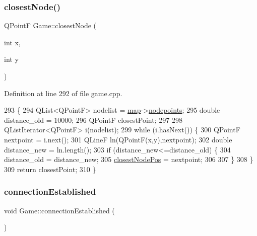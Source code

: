 \mbox{\label{class_game_ae0adfbcc271a45a2c3ede2c6b948beda}} 
\subsubsection{\texorpdfstring{closest\+Node()}{closestNode()}}
{\footnotesize\ttfamily Q\+PointF Game\+::closest\+Node (\begin{DoxyParamCaption}\item[{int}]{x,  }\item[{int}]{y }\end{DoxyParamCaption})}



Definition at line 292 of file game.\+cpp.


\begin{DoxyCode}
293 \{
294     QList<QPointF> nodelist = \hyperlink{class_game_acef3a39fdf14be2c980b0dc11e7be402}{map}->\hyperlink{class_map_a07f51de84c133707fedaeffd04aff2d5}{nodepoints};
295     \textcolor{keywordtype}{double} distance\_old = 10000;
296     QPointF closestPoint;
297 
298     QListIterator<QPointF> i(nodelist);
299     \textcolor{keywordflow}{while} (i.hasNext()) \{
300         QPointF nextpoint = i.next();
301         QLineF ln(QPointF(x,y),nextpoint);
302         \textcolor{keywordtype}{double} distance\_new = ln.length();
303         \textcolor{keywordflow}{if} (distance\_new<=distance\_old) \{
304             distance\_old = distance\_new;
305             \hyperlink{class_game_a861bf240380d110b285659d8af3f0406}{closestNodePos} = nextpoint;
306 
307         \}
308     \}
309     \textcolor{keywordflow}{return} closestPoint;
310 \}
\end{DoxyCode}
\mbox{\label{class_game_a480aa57ccdd02118f7716b4870a2b47c}} 
\subsubsection{\texorpdfstring{connection\+Established}{connectionEstablished}}
{\footnotesize\ttfamily void Game\+::connection\+Established (\begin{DoxyParamCaption}{ }\end{DoxyParamCaption})\hspace{0.3cm}{\ttfamily [slot]}}



